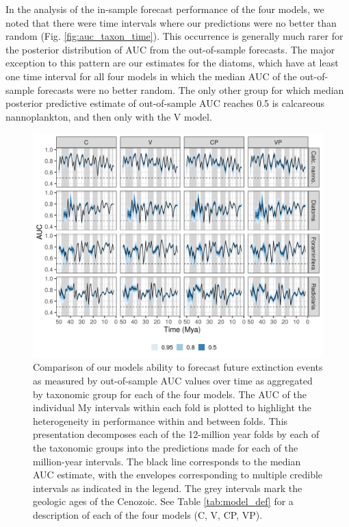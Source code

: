 \documentclass[12pt,letterpaper]{article}
\begin{document}
\begin{refsection}
In the analysis of the in-sample forecast performance of the four models, we noted that there were time intervals where our predictions were no better than random (Fig. \ref{fig:auc_taxon_time}). This occurrence is generally much rarer for the posterior distribution of AUC from the out-of-sample forecasts. The major exception to this pattern are our estimates for the diatoms, which have at least one time interval for all four models in which the median AUC of the out-of-sample forecasts were no better random. The only other group for which median posterior predictive estimate of out-of-sample AUC reaches 0.5 is calcareous nannoplankton, and then only with the V model.
\begin{figure}[ht]
 \centering
 \includegraphics[width=\textwidth,height=0.5\textheight,keepaspectratio=true]{../results/figure/fold_auc_taxon_time_full}
 \caption{Comparison of our models ability to forecast future extinction events as measured by out-of-sample AUC values over time as aggregated by taxonomic group for each of the four models. The AUC of the individual My intervals within each fold is plotted to highlight the heterogeneity in performance within and between folds. This presentation decomposes each of the 12-million year folds by each of the taxonomic groups into the predictions made for each of the million-year intervals. The black line corresponds to the median AUC estimate, with the envelopes corresponding to multiple credible intervals as indicated in the legend. The grey intervals mark the geologic ages of the Cenozoic. See Table \ref{tab:model_def} for a description of each of the four models (C, V, CP, VP).}
 \label{fig:fold_auc_taxon_time}
\end{figure}



\end{refsection}
\end{document}
